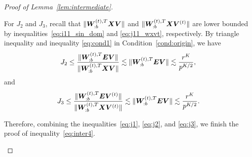 \documentclass[lettersize,onecolumn,journal]{IEEEtran}
\theoremstyle{definition}
\theoremstyle{definition}
\begin{document}
\begin{proof}[Proof of Lemma~\ref{lem:intermediate}]
\begin{enumerate}
    
    For $J_2$ and $J_3$, recall that $\lVert\bm{W}_{:b}^{(t),T} \bm X \bm{V} \rVert$ and $\lVert\bm{W}_{:b}^{(t),T} \bm X \bm{V}^{(t)} \rVert$ are lower bounded by inequalities~\eqref{eq:i11_sin_dom} and \eqref{eq:j11_wxvt}, respectively. By triangle inequality and inequality \eqref{eq:cond1} in Condition~\ref{cond:origin}, we have 
    \begin{equation}\label{eq:j2}
        J_2 \leq \frac{ \onormSize{}{\mW_{:b}^{(t),T} \mE \mV}  }{  \onormSize{}{\mW_{:b}^{(t),T} \mX \mV} } \lesssim \onormSize{}{\mW_{:b}^{(t),T} \mE \mV} \lesssim \frac{r^K}{p^{K/2}},
    \end{equation}
    and 
    \begin{equation}\label{eq:j3}
        J_3 \leq \frac{ \onormSize{}{\mW_{:b}^{(t),T} \mE \mV^{(t)}}  }{  \onormSize{}{\mW_{:b}^{(t),T} \mX \mV^{(t)}} } \lesssim \onormSize{}{\mW_{:b}^{(t),T} \mE \mV} \lesssim \frac{r^K}{p^{K/2}}.
    \end{equation}
    
    Therefore, combining the inequalities~\eqref{eq:j1}, \eqref{eq:j2}, and \eqref{eq:j3}, we finish the proof of inequality~\eqref{eq:inter4}. 
    
    


\end{enumerate}
\end{proof}
\end{document}
